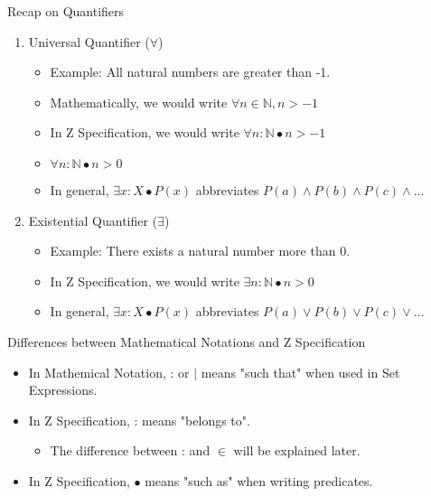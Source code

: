 \documentclass[aspectratio=169]{beamer}
\begin{document}
\begin{frame}{Recap on Quantifiers}
    \begin{enumerate}
        \item Universal Quantifier ($\forall$)
        \begin{itemize}
            \item Example: All natural numbers are greater than -1.
            \item Mathematically, we would write $\forall n \in \mathbb{N}, n > -1$
            \item In Z Specification, we would write $\forall n : \mathbb{N} \bullet n > -1$
            \item $\forall n : \mathbb{N} \bullet n > 0$
            \item In general, $\exists x : X \bullet P(x)$ abbreviates $P(a) \wedge P(b) \wedge P(c) \wedge \ldots$
        \end{itemize}
        \item Existential Quantifier ($\exists$)
        \begin{itemize}
            \item Example: There exists a natural number more than 0.
            \item In Z Specification, we would write $\exists n : \mathbb{N} \bullet n > 0$
            \item In general, $\exists x : X \bullet P(x)$ abbreviates $P(a) \vee P(b) \vee P(c) \vee \ldots$
        \end{itemize}
    \end{enumerate}
    \begin{block}{Differences between Mathematical Notations and Z Specification}
        \begin{itemize}
            \item In Mathemical Notation, : or $\mid$ means "such that" when used in Set Expressions.
            \item In Z Specification, : means "belongs to".
            \begin{itemize}
                \item The difference between : and $\in$ will be explained later.
            \end{itemize}
            \item In Z Specification, $\bullet$ means "such as" when writing predicates.
        \end{itemize}
    \end{block}
\end{frame}
\end{document}
